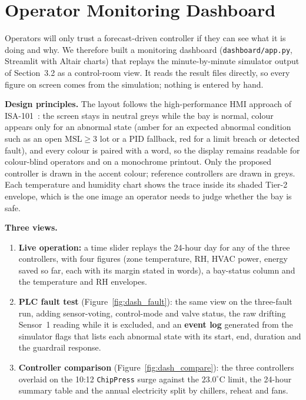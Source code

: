 \section{Operator Monitoring Dashboard}
\label{sec:dashboard}

Operators will only trust a forecast-driven controller if they can see what it is doing and why. We therefore built a monitoring dashboard (\texttt{dashboard/app.py}, Streamlit with Altair charts) that replays the minute-by-minute simulator output of Section~3.2 as a control-room view. It reads the result files directly, so every figure on screen comes from the simulation; nothing is entered by hand.

\textbf{Design principles.} The layout follows the high-performance HMI approach of ISA-101~\cite{isa101}: the screen stays in neutral greys while the bay is normal, colour appears only for an abnormal state (amber for an expected abnormal condition such as an open $\text{MSL} \ge 3$ lot or a PID fallback, red for a limit breach or detected fault), and every colour is paired with a word, so the display remains readable for colour-blind operators and on a monochrome printout. Only the proposed controller is drawn in the accent colour; reference controllers are drawn in greys. Each temperature and humidity chart shows the trace inside its shaded Tier-2 envelope, which is the one image an operator needs to judge whether the bay is safe.

\textbf{Three views.}
\begin{enumerate}
    \item \textbf{Live operation:} a time slider replays the 24-hour day for any of the three controllers, with four figures (zone temperature, RH, HVAC power, energy saved so far, each with its margin stated in words), a bay-status column and the temperature and RH envelopes.
    \item \textbf{PLC fault test} (Figure~\ref{fig:dash_fault}): the same view on the three-fault run, adding sensor-voting, control-mode and valve status, the raw drifting Sensor~1 reading while it is excluded, and an \textbf{event log} generated from the simulator flags that lists each abnormal state with its start, end, duration and the guardrail response.
    \item \textbf{Controller comparison} (Figure~\ref{fig:dash_compare}): the three controllers overlaid on the 10:12 \texttt{ChipPress} surge against the $23.0^\circ\text{C}$ limit, the 24-hour summary table and the annual electricity split by chillers, reheat and fans.
\end{enumerate}

